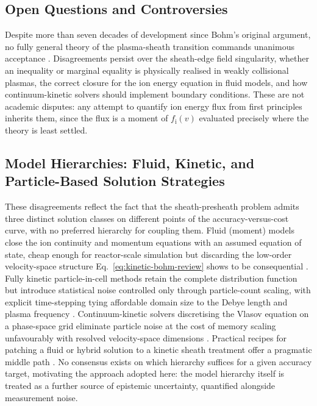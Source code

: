 \subsection{Open Questions and Controversies}

Despite more than seven decades of development since Bohm's original argument, no fully general theory of the plasma-sheath transition commands unanimous acceptance \cite{ref0015}. Disagreements persist over the sheath-edge field singularity, whether an inequality or marginal equality is physically realised in weakly collisional plasmas, the correct closure for the ion energy equation in fluid models, and how continuum-kinetic solvers should implement boundary conditions. These are not academic disputes: any attempt to quantify ion energy flux from first principles inherits them, since the flux is a moment of $f_{\mathrm{i}}(v)$ evaluated precisely where the theory is least settled.

\subsection{Model Hierarchies: Fluid, Kinetic, and Particle-Based Solution Strategies}

These disagreements reflect the fact that the sheath-presheath problem admits three distinct solution classes on different points of the accuracy-versus-cost curve, with no preferred hierarchy for coupling them. Fluid (moment) models close the ion continuity and momentum equations with an assumed equation of state, cheap enough for reactor-scale simulation but discarding the low-order velocity-space structure Eq.~\eqref{eq:kinetic-bohm-review} shows to be consequential \cite{ref0023}. Fully kinetic particle-in-cell methods retain the complete distribution function but introduce statistical noise controlled only through particle-count scaling, with explicit time-stepping tying affordable domain size to the Debye length and plasma frequency \cite{ref0631}. Continuum-kinetic solvers discretising the Vlasov equation on a phase-space grid eliminate particle noise at the cost of memory scaling unfavourably with resolved velocity-space dimensions \cite{ref0659}. Practical recipes for patching a fluid or hybrid solution to a kinetic sheath treatment offer a pragmatic middle path \cite{ref0012}. No consensus exists on which hierarchy suffices for a given accuracy target, motivating the approach adopted here: the model hierarchy itself is treated as a further source of epistemic uncertainty, quantified alongside measurement noise.

